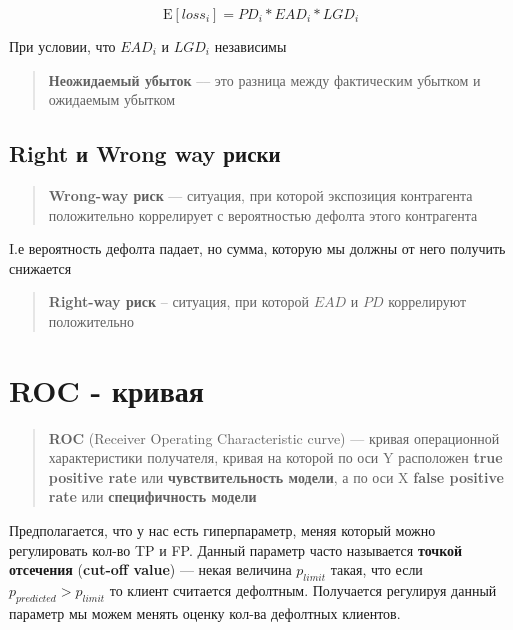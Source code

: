 \documentclass{article}
\begin{document}
            \begin{equation}
                \mathrm{E}[loss_{i}] = PD_{i} * EAD_{i} * LGD_{i}
            \end{equation}

            При условии, что $EAD_{i}$ и $LGD_{i}$ независимы
            \begin{quote}
                \textbf{Неожидаемый убыток} --– это разница между фактическим убытком и ожидаемым убытком
            \end{quote}

        \subsection{Right и Wrong way риски}

            \begin{quote}
                \textbf{Wrong-way риск} --- ситуация, при которой экспозиция контрагента положительно коррелирует с вероятностью дефолта этого контрагента

            \end{quote}

            I.е вероятность дефолта падает, но сумма, которую мы должны от него получить снижается

            \begin{quote}
                \textbf{Right-way риск} -- ситуация, при которой $EAD$ и $PD$ коррелируют положительно
            \end{quote}
    \section{ROC - кривая}
        \begin{quote}
            \textbf{ROC} (Receiver Operating Characteristic curve) --- кривая операционной характеристики получателя,
            кривая на которой по оси Y расположен \textbf{true positive rate} или
            \textbf{чувствительность модели}, а по оси X \textbf{false positive rate} или \textbf{специфичность модели}
        \end{quote}

        Предполагается, что у нас есть гиперпараметр, меняя который можно регулировать кол-во TP и FP.
        Данный параметр часто называется \textbf{точкой отсечения} (\textbf{cut-off value}) --- некая величина
        $p_{limit}$ такая, что если $p_{predicted} > p_{limit}$ то клиент считается дефолтным. Получается регулируя
        данный параметр мы можем менять оценку кол-ва дефолтных клиентов.
\end{document}
